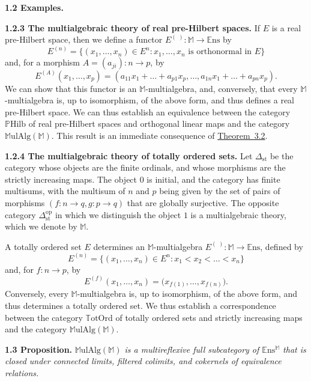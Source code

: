 \documentclass{article}
\newenvironment{itenv}[1]
  {\phantomsection\par\medskip\noindent\textbf{#1.}\itshape}
  {\par\medskip}
\newenvironment{rmenv}[1]
  {\phantomsection\par\medskip\noindent\textbf{#1.}\rmfamily}
  {\par\medskip}
\newcommand{\bb}[1]{{\mathbb{#1}}}
\newcommand{\op}{{\mathrm{op}}}
\newcommand{\st}{{\mathrm{st}}}
\newcommand{\Set}{\mathbb{E}\mathrm{ns}}
\newcommand{\MulAlg}{\mathbb{M}\mathrm{ulAlg}}
\newcommand{\PHilb}{\mathbb{P}\mathrm{Hilb}}
\newcommand{\TotOrd}{\mathbb{T}\mathrm{otOrd}}
\newcommand{\oldpage}[1]{\marginpar{\footnotesize$\Big\vert$ \textit{p.~#1}}}
\begin{document}
\begin{rmenv}{1.2 Examples}
\begin{rmenv}{1.2.3 The multialgebraic theory of real pre-Hilbert spaces}
    If $E$ is a real pre-Hilbert space, then we define a functor $E^{(\,\,)}\colon\bb{M}\to\Set$ by
    \[
      E^{(n)} =
      \big\{
        (x_1,\ldots,x_n)\in E^n
        :
        \mbox{$x_1,\ldots,x_n$ is orthonormal in $E$}
      \big\}
    \]
    and, for a morphism $A=(a_{ji})\colon n\to p$, by
    \[
      E^{(A)}(x_1,\ldots,x_p) =
      (a_{11}x_1+\ldots+a_{p1}x_p,\ldots,a_{1n}x_1+\ldots+a_{pn}x_p).
    \]
    We can show that this functor is an $\bb{M}$-multialgebra, and, conversely, that every $\bb{M}$-multialgebra is, up to isomorphism, of the above form, and thus defines a real pre-Hilbert space.
    We can thus establish an equivalence between the category $\PHilb$ of real pre-Hilbert spaces and orthogonal linear maps and the category $\MulAlg(\bb{M})$.
    This result is an immediate consequence of \hyperref[3.2]{Theorem~3.2}.
  \end{rmenv}

  \begin{rmenv}{1.2.4 The multialgebraic theory of totally ordered sets}
  \label{1.2.4}
    Let $\Delta_\st$ be the category whose objects are the finite ordinals, and whose morphisms are the
\oldpage{197}
    strictly increasing maps.
    The object $0$ is initial, and the category has finite multisums, with the multisum of $n$ and $p$ being given by the set of pairs of morphisms $(f\colon n\to q,g\colon p\to q)$ that are globally surjective.
    The opposite category $\Delta_\st^\op$ in which we distinguish the object $1$ is a multialgebraic theory, which we denote by $\bb{M}$.

    A totally ordered set $E$ determines an $\bb{M}$-multialgebra $E^{(\,\,)}\colon\bb{M}\to\Set$, defined by
    \[
      E^{(n)} =
      \big\{
        (x_1,\ldots,x_n)\in E^n
        :
        x_1<x_2<\ldots<x_n
      \big\}
    \]
    and, for $f\colon n\to p$, by
    \[
      E^{(f)}(x_1,\ldots,x_n) =
      \big(
        x_{f(1)},\ldots,x_{f(n)}
      \big).
    \]
    Conversely, every $\bb{M}$-multialgebra is, up to isomorphism, of the above form, and thus determines a totally ordered set.
    We thus establish a correspondence between the category $\TotOrd$ of totally ordered sets and strictly increasing maps and the category $\MulAlg(\bb{M})$.
  \end{rmenv}

\end{rmenv}

\begin{itenv}{1.3 Proposition}
\label{1.3}
  $\MulAlg(\bb{M})$ is a multireflexive full subcategory of $\Set^\bb{M}$ that is closed under connected limits, filtered colimits, and cokernels of equivalence relations.
\end{itenv}
\end{document}
